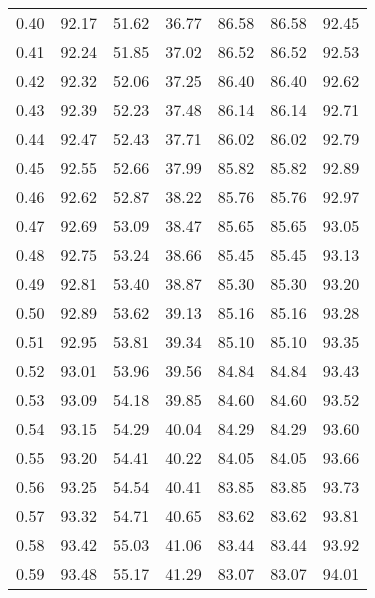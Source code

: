 \begin{tabular}{|c|c|c|c|c|c|c|}
      0.40 &     92.17 &     51.62 &      36.77 &   86.58 &      86.58 &         92.45 \\
      0.41 &     92.24 &     51.85 &      37.02 &   86.52 &      86.52 &         92.53 \\
      0.42 &     92.32 &     52.06 &      37.25 &   86.40 &      86.40 &         92.62 \\
      0.43 &     92.39 &     52.23 &      37.48 &   86.14 &      86.14 &         92.71 \\
      0.44 &     92.47 &     52.43 &      37.71 &   86.02 &      86.02 &         92.79 \\
      0.45 &     92.55 &     52.66 &      37.99 &   85.82 &      85.82 &         92.89 \\
      0.46 &     92.62 &     52.87 &      38.22 &   85.76 &      85.76 &         92.97 \\
      0.47 &     92.69 &     53.09 &      38.47 &   85.65 &      85.65 &         93.05 \\
      0.48 &     92.75 &     53.24 &      38.66 &   85.45 &      85.45 &         93.13 \\
      0.49 &     92.81 &     53.40 &      38.87 &   85.30 &      85.30 &         93.20 \\
      0.50 &     92.89 &     53.62 &      39.13 &   85.16 &      85.16 &         93.28 \\
      0.51 &     92.95 &     53.81 &      39.34 &   85.10 &      85.10 &         93.35 \\
      0.52 &     93.01 &     53.96 &      39.56 &   84.84 &      84.84 &         93.43 \\
      0.53 &     93.09 &     54.18 &      39.85 &   84.60 &      84.60 &         93.52 \\
      0.54 &     93.15 &     54.29 &      40.04 &   84.29 &      84.29 &         93.60 \\
      0.55 &     93.20 &     54.41 &      40.22 &   84.05 &      84.05 &         93.66 \\
      0.56 &     93.25 &     54.54 &      40.41 &   83.85 &      83.85 &         93.73 \\
      0.57 &     93.32 &     54.71 &      40.65 &   83.62 &      83.62 &         93.81 \\
      0.58 &     93.42 &     55.03 &      41.06 &   83.44 &      83.44 &         93.92 \\
      0.59 &     93.48 &     55.17 &      41.29 &   83.07 &      83.07 &         94.01 \\

\end{tabular}
